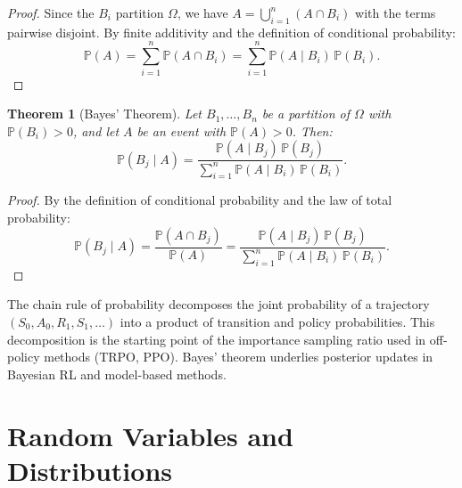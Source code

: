 \documentclass[11pt,a4paper]{article}
\theoremstyle{definition}
\theoremstyle{plain}
\newtheorem{theorem}{Theorem}[section]
\theoremstyle{remark}
\newcommand{\Prob}{\mathbb{P}}
\begin{document}
\begin{proof}
Since the $B_i$ partition $\Omega$, we have $A = \bigcup_{i=1}^n (A \cap B_i)$ with the terms pairwise disjoint. By finite additivity and the definition of conditional probability:
\begin{equation}
    \Prob(A) = \sum_{i=1}^n \Prob(A \cap B_i) = \sum_{i=1}^n \Prob(A \mid B_i)\, \Prob(B_i).
\end{equation}
\end{proof}

\begin{keyresult}
\begin{theorem}[Bayes' Theorem]
\label{thm:bayes}
Let $B_1, \ldots, B_n$ be a partition of $\Omega$ with $\Prob(B_i) > 0$, and let $A$ be an event with $\Prob(A) > 0$. Then:
\begin{equation}
    \Prob(B_j \mid A) = \frac{\Prob(A \mid B_j)\, \Prob(B_j)}{\sum_{i=1}^n \Prob(A \mid B_i)\, \Prob(B_i)}.
    \label{eq:bayes}
\end{equation}
\end{theorem}
\end{keyresult}

\begin{proof}
By the definition of conditional probability and the law of total probability:
\begin{equation}
    \Prob(B_j \mid A) = \frac{\Prob(A \cap B_j)}{\Prob(A)} = \frac{\Prob(A \mid B_j)\, \Prob(B_j)}{\sum_{i=1}^n \Prob(A \mid B_i)\, \Prob(B_i)}.
\end{equation}
\end{proof}

\begin{rlconnection}[Connection to RL]
The chain rule of probability decomposes the joint probability of a trajectory $(S_0, A_0, R_1, S_1, \ldots)$ into a product of transition and policy probabilities. This decomposition is the starting point of the importance sampling ratio used in off-policy methods (TRPO, PPO). Bayes' theorem underlies posterior updates in Bayesian RL and model-based methods.
\end{rlconnection}

\section{Random Variables and Distributions}
\label{sec:random_variables}
\end{document}
